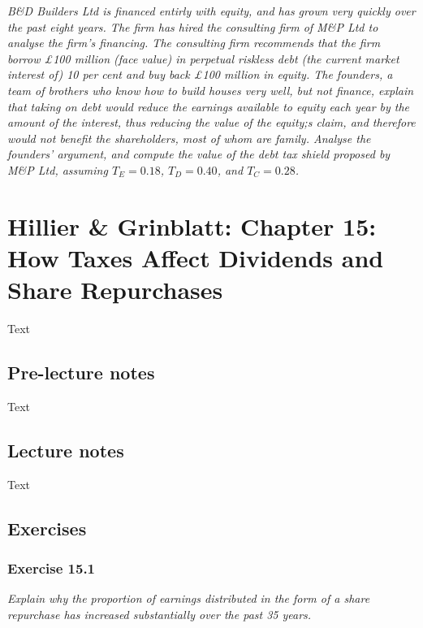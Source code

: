 \documentclass[]{book}
\theoremstyle{definition}
\theoremstyle{definition}
\theoremstyle{remark}
\begin{document}
\emph{B\&D Builders Ltd is financed entirly with equity, and has grown
very quickly over the past eight years. The firm has hired the
consulting firm of M\&P Ltd to analyse the firm's financing. The
consulting firm recommends that the firm borrow £100 million (face
value) in perpetual riskless debt (the current market interest of) 10
per cent and buy back £100 million in equity. The founders, a team of
brothers who know how to build houses very well, but not finance,
explain that taking on debt would reduce the earnings available to
equity each year by the amount of the interest, thus reducing the value
of the equity;s claim, and therefore would not benefit the shareholders,
most of whom are family. Analyse the founders' argument, and compute the
value of the debt tax shield proposed by M\&P Ltd, assuming
\(T_E=0.18\), \(T_D=0.40\), and \(T_C=0.28\).} \citep[p.494]{book}

\chapter{Hillier \& Grinblatt: Chapter 15: How Taxes Affect Dividends
and Share
Repurchases}\label{hillier-grinblatt-chapter-15-how-taxes-affect-dividends-and-share-repurchases}

Text

\section{Pre-lecture notes}\label{pre-lecture-notes-14}

Text

\section{Lecture notes}\label{lecture-notes-14}

Text

\section{Exercises}\label{exercises-14}

\subsection{Exercise 15.1}\label{exercise-15.1}

\emph{Explain why the proportion of earnings distributed in the form of
a share repurchase has increased substantially over the past 35 years.}
\citep[p.518]{book}
\end{document}

